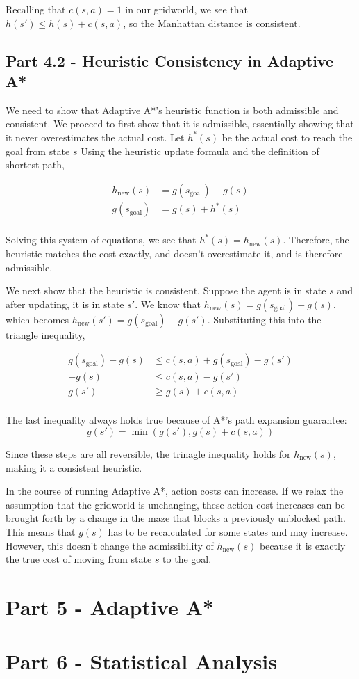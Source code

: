 \documentclass[12pt]{article}
\begin{document}
Recalling that $c(s, a) = 1$ in our gridworld,
we see that $h(s') \leq h(s) + c(s, a)$,
so the Manhattan distance is consistent.

\subsection{Part 4.2 - Heuristic Consistency in Adaptive A*}

We need to show that Adaptive A*'s heuristic function is both admissible and consistent.
We proceed to first show that it is admissible,
essentially showing that it never overestimates the actual cost.
Let $h^* (s)$ be the actual cost to reach the goal from state $s$
Using the heuristic update formula and the definition of shortest path,

\begin{align*}
    h_{\text{new}} (s) &= g(s_{\text{goal}}) - g(s) \\
    g(s_{\text{goal}}) &= g(s) + h^*(s) \\
\end{align*}

Solving this system of equations,
we see that 
$h^* (s) = h_{\text{new}} (s)$.
Therefore,
the heuristic matches the cost exactly,
and doesn't overestimate it,
and is therefore admissible.

We next show that the heuristic is consistent.
Suppose the agent is in state $s$ and after updating,
it is in state $s'$.
We know that 
$h_{\text{new}} (s) = g(s_{\text{goal}}) - g(s)$,
which becomes
$h_{\text{new}} (s') = g(s_{\text{goal}}) - g(s')$.
Substituting this into the triangle inequality,

\begin{align*}
g(s_{\text{goal}}) - g(s) & \leq c(s, a) + g(s_{\text{goal}}) - g(s') \\
-g(s) & \leq c(s, a) - g(s') \\
g(s') & \geq g(s) + c(s, a) \\
\end{align*}

The last inequality always holds true because of A*'s path expansion guarantee:
$$g(s') = \min(g(s'), g(s) + c(s, a))$$

Since these steps are all reversible,
the trinagle inequality holds for $h_{\text{new}} (s)$,
making it a consistent heuristic.

In the course of running Adaptive A*,
action costs can increase.
If we relax the assumption that the gridworld is unchanging,
these action cost increases can be brought forth by a change in the maze that blocks a previously unblocked path.
This means that 
$g(s)$ 
has to be recalculated for some states and may increase.
However,
this doesn't change the admissibility of $h_\text{new} (s)$
because it is exactly the true cost of moving from state 
$s$
to the goal.

\section{Part 5 - Adaptive A*}



\section{Part 6 - Statistical Analysis}
\end{document}
